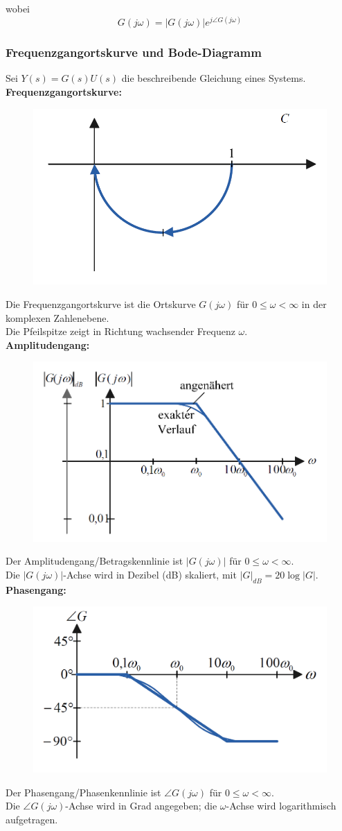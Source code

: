 \documentclass[10pt,a4paper]{article}
\begin{document}
wobei
$$
	G(j \omega) = |G(j \omega)| e^{j \angle G(j \omega)}
$$

\subsubsection{Frequenzgangortskurve und Bode-Diagramm}
Sei $Y(s) = G(s)U(s)$ die beschreibende Gleichung eines Systems. \\

\textbf{Frequenzgangortskurve:} \\
\begin{figure}[H]
	\includegraphics[width=0.3\columnwidth]{imgs/frequenzgangortskurve.png}
\end{figure}
Die Frequenzgangortskurve ist die Ortskurve $G(j \omega)$ für $0 ≤ \omega < ∞$ in der komplexen Zahlenebene. \\
Die Pfeilspitze zeigt in Richtung wachsender Frequenz $\omega$. \\

\textbf{Amplitudengang:} \\
\begin{figure}[H]
	\includegraphics[width=0.3\columnwidth]{imgs/betragskennlinie.png}
\end{figure}
Der Amplitudengang/Betragskennlinie ist $|G(j \omega)|$ für $0 ≤ \omega < ∞$. \\
Die $|G(j \omega)|$-Achse wird in Dezibel (dB) skaliert, mit $|G|_{dB} = 20\log|G|$. \\

\textbf{Phasengang:} \\
\begin{figure}[H]
	\includegraphics[width=0.3\columnwidth]{imgs/phasenkennlinie.png}
\end{figure}
Der Phasengang/Phasenkennlinie ist $\angle G(j \omega)$ für $0 ≤ \omega < ∞$. \\
Die $\angle G(j \omega)$-Achse wird in Grad angegeben; die $\omega$-Achse wird logarithmisch aufgetragen. \\
\end{document}
